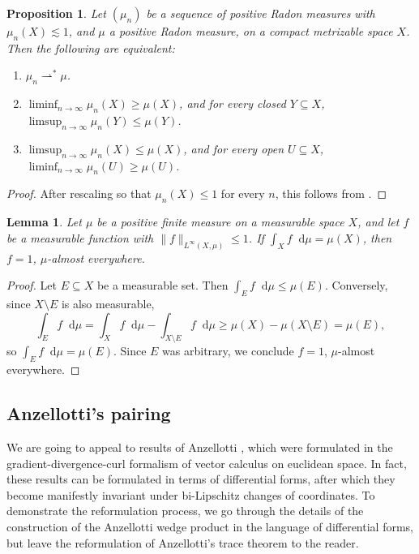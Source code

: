 \documentclass[reqno,11pt]{amsart}
\newcommand*\dif{\mathop{}\!\mathrm{d}}
\newcommand{\weakto}{\rightharpoonup}
\newtheorem{lemma}[theorem]{Lemma}
\newtheorem{proposition}[theorem]{Proposition}
\theoremstyle{definition}
\numberwithin{equation}{section}
\begin{document}
\begin{proposition}\label{portmanteau}
Let $(\mu_n)$ be a sequence of positive Radon measures with $\mu_n(X) \lesssim 1$, and $\mu$ a positive Radon measure, on a compact metrizable space $X$.
Then the following are equivalent:
\begin{enumerate}
\item $\mu_n \weakto^* \mu$.
\item $\liminf_{n \to \infty} \mu_n(X) \geq \mu(X)$, and for every closed $Y \subseteq X$, $\limsup_{n \to \infty} \mu_n(Y) \leq \mu(Y)$.
\item $\limsup_{n \to \infty} \mu_n(X) \leq \mu(X)$, and for every open $U \subseteq X$, $\liminf_{n \to \infty} \mu_n(U) \geq \mu(U)$.
\end{enumerate}
\end{proposition}
\begin{proof}
After rescaling so that $\mu_n(X) \leq 1$ for every $n$, this follows from \cite[Theorem 13.16]{klenke2013probability}.
\end{proof}

\begin{lemma}\label{measurable function is 1}
Let $\mu$ be a positive finite measure on a measurable space $X$, and let $f$ be a measurable function with $\|f\|_{L^\infty(X, \mu)} \leq 1$.
If $\int_X f \dif \mu = \mu(X)$, then $f = 1$, $\mu$-almost everywhere.
\end{lemma}
\begin{proof}
Let $E \subseteq X$ be a measurable set.
Then $\int_E f \dif \mu \leq \mu(E)$.
Conversely, since $X \setminus E$ is also measurable,
$$\int_E f \dif \mu = \int_X f \dif \mu - \int_{X \setminus E} f \dif \mu \geq \mu(X) - \mu(X \setminus E) = \mu(E),$$
so $\int_E f \dif \mu = \mu(E)$.
Since $E$ was arbitrary, we conclude $f = 1$, $\mu$-almost everywhere.
\end{proof}

\subsection{Anzellotti's pairing}
We are going to appeal to results of Anzellotti \cite{Anzellotti1983}, which were formulated in the gradient-divergence-curl formalism of vector calculus on euclidean space.
In fact, these results can be formulated in terms of differential forms, after which they become manifestly invariant under bi-Lipschitz changes of coordinates.
To demonstrate the reformulation process, we go through the details of the construction of the Anzellotti wedge product in the language of differential forms, but leave the reformulation of Anzellotti's trace theorem to the reader.
\end{document}

